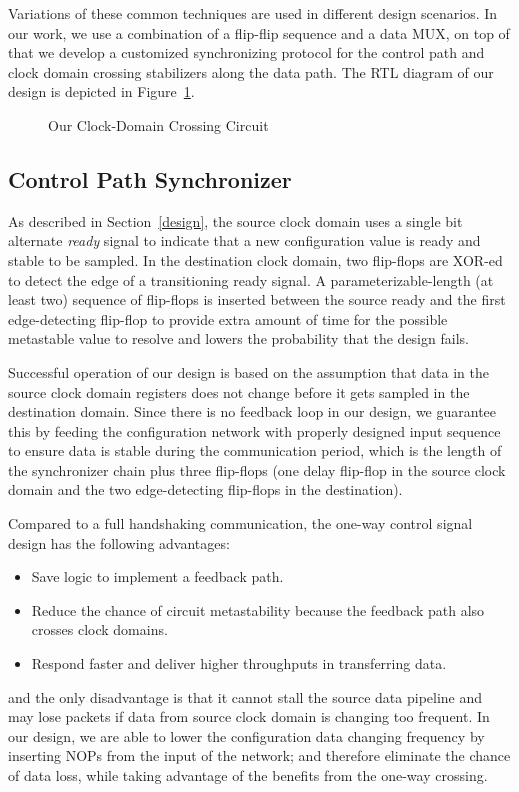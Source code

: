 \documentclass[12pt]{article}
\newcommand{\reffig}[1]{Figure~\ref{#1}}
\newcommand{\refsec}[1]{Section~\ref{#1}}
\begin{document}
Variations of these common techniques are used in different design scenarios.
In our work, we use a combination of a flip-flip sequence and a data MUX, on
top of that we develop a customized synchronizing protocol for the control path
and clock domain crossing stabilizers along the data path. The RTL diagram of
our design is depicted in \reffig{fig:our-cdc}.

\begin{figure}
\centering

\caption{Our Clock-Domain Crossing Circuit}
\label{fig:our-cdc}
\end{figure}

\subsection{Control Path Synchronizer} \label{control}
As described in \refsec{design}, the source clock domain uses a single bit
alternate \textit{ready} signal to indicate that a new configuration value is
ready and stable to be sampled. In the destination clock domain, two flip-flops
are XOR-ed to detect the edge of a transitioning ready signal. A
parameterizable-length (at least two) sequence of flip-flops is inserted
between the source ready and the first edge-detecting flip-flop to provide
extra amount of time for the possible metastable value to resolve and lowers
the probability that the design fails. %

Successful operation of our design is based on the assumption that data in the
source clock domain registers does not change before it gets sampled in the
destination domain. Since there is no feedback loop in our design, we guarantee
this by feeding the configuration network with properly designed input sequence
to ensure data is stable during the communication period, which is the length
of the synchronizer chain plus three flip-flops (one delay flip-flop in the
source clock domain and the two edge-detecting flip-flops in the destination).

Compared to a full handshaking communication, the one-way control signal design
has the following advantages:
\begin{itemize}
\item Save logic to implement a feedback path.
\item Reduce the chance of circuit metastability because the feedback path also
      crosses clock domains.
\item Respond faster and deliver higher throughputs in transferring data.
\end{itemize}
and the only disadvantage is that it cannot stall the source data pipeline and
may lose packets if data from source clock domain is changing too frequent.
In our design, we are able to lower the configuration data changing frequency
by inserting NOPs from the input of the network; and therefore eliminate the
chance of data loss, while taking advantage of the benefits from the one-way
crossing.
\end{document}
